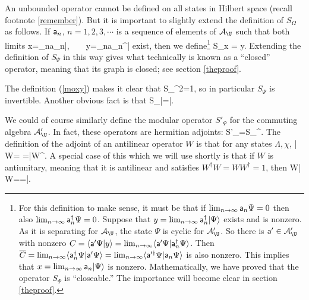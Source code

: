 \documentclass[12pt]{article}
\def\a{{\sf a}}
\def\bar{\overline}
\def\ra{\rangle}
\def\la{\langle}
\numberwithin{equation}{section}
\def\bar{\overline}
\def\A{{\mathcal A}}
\def\bar{\overline}
\begin{document}
An unbounded operator cannot be defined on all states in Hilbert space (recall footnote \ref{remember}).  But it is important to slightly extend the definition of $S_\Omega$ as follows.  If $\a_n$, $n=1,2,3,\cdots$ is a sequence of elements of $\A_\U$ such
that both limits
\be\label{zonto}x=\lim_{n\to\infty}\a_n|\Psi\ra,~~~~y=\lim_{n\to\infty}\a_n^\dagger|\Psi\ra\ee
exist, then we define\footnote{\label{closeable} For this definition to make sense, it must be that if $\lim_{n\to\infty}\a_n\Psi=0$ then
also $\lim_{n\to\infty}\a_n^\dagger\Psi=0$.   
Suppose that $y=\lim_{n\to\infty}\a_n^\dagger|\Psi\ra$ exists and 
is nonzero.   As it is separating for $\A_\U$, the state $\Psi$ is cyclic for $\A'_\U$.  
So there is $\a'\in\A'_\U$ with nonzero $C=\la \a'\Psi|y\ra=\lim_{n\to\infty}\la \a'\Psi|\a_n^\dagger\Psi\ra$.  Then $\bar C=\lim_{n\to\infty}
\la \a_n^\dagger\Psi|\a'\Psi\ra =\lim_{n\to\infty}\la\a'^\dagger\Psi |\a_n\Psi\ra$ is also nonzero.  This implies that $x=\lim_{n\to\infty}\a_n|\Psi\ra$
is nonzero.
 Mathematically, we have proved that the operator $S_\Psi$ is ``closeable.''  The importance  will become clear in section \ref{theproof}.}
\be\label{ronto}S_\Psi x = y. \ee
Extending the definition of $S_\Psi$ in this way gives what technically is known as a ``closed'' operator, meaning that its
graph is closed; see section \ref{theproof}.

The definition (\ref{moxy}) makes it clear that 
\be\label{plonto}S_\Psi^2=1,\ee
so in particular $S_\Psi$ is invertible.  Another obvious fact is that
\be\label{lonto}S_\Psi|\Psi\ra=|\Psi\ra. \ee

We could of course similarly define the modular operator $S'_\Psi$ for the commuting algebra $\A'_{\U}$.  In fact, these
operators are hermitian adjoints:
\be\label{wonto} S'_\Psi=S_\Psi^\dagger.\ee
The definition of the adjoint of an antilinear operator $W$ is that for any states $\Lambda, \chi$, 
\be\label{donto} \la \Lambda| W\chi\ra = \overline {\la W^\dagger \Lambda|\chi\ra}=\la\chi|W^\dagger\Lambda\ra.\ee
A special case of this which we will use shortly is that if $W$ is antiunitary, meaning that it is antilinear and satisfies
$W^\dagger W=W W^\dagger=1$, then
\be\label{ponto}\la W\Lambda| W\chi\ra=\overline{\la\Lambda|\chi\ra}=\la\chi|\Lambda\ra.\ee
\end{document}
